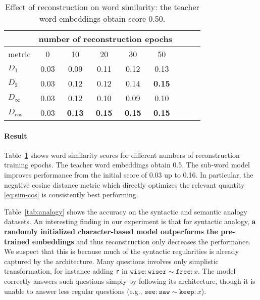 \documentclass[11pt,letterpaper,UTF8]{article}
\begin{document}
\begin{CJK}{UTF8}{gbsn}
\begin{table}[t!]
\begin{center}
{
\begin{tabular}{|l|c|c|c|c|c|c|c|c|}
\hline
                &  \multicolumn{5}{c|}{number of reconstruction epochs}        \\
\hline
metric          &   0           &  10             &  20           &  30    &  50  \\
\hline
$D_1$           &  0.03         &  0.09           & 0.11          & 0.12   &  0.13 \\
$D_2$           &  0.03         &  0.12           & 0.12          & 0.14   &  \textbf{0.15} \\
$D_\infty$       &  0.03         &  0.12           & 0.10          & 0.09   &  0.10 \\
$D_{\cos{}}$     &  0.03         &  \textbf{0.13}  & \textbf{0.15} & \textbf{0.15}  &  \textbf{0.15} \\
\hline
\end{tabular}
\caption{Effect of reconstruction on word similarity: the teacher word embeddings obtain score 0.50.}
\label{tab:similarity}
}
\end{center}
\vspace{-1mm}
\end{table}

\paragraph{Result}
Table~\ref{tab:similarity} shows word similarity scores for different numbers of reconstruction training epochs.
The teacher word embeddings obtain 0.5. The sub-word model improves performance from the initial score of 0.03 up to 0.16.
In particular, the negative cosine distance metric which directly optimizes the relevant quantity \eqref{eq:sim-cos}
is consistently best performing.

Table~\ref{tab:analogy} shows the accuracy on the syntactic and semantic analogy datasets.
An interesting finding in our experiment is that for syntactic analogy,
\textbf{a randomly initialized character-based model outperforms the pre-trained embeddings}
and thus reconstruction only decreases the performance.
We suspect that this is because much of the syntactic regularities is already captured by the architecture.
Many questions involves only simplistic transformation, for instance adding \texttt{r} in $\texttt{wise}:\texttt{wiser}\sim\texttt{free}:x$.
The model correctly answers such questions simply by following its architecture, though it is unable to
answer less regular questions (e.g., $\texttt{see}:\texttt{saw}\sim\texttt{keep}:x$).


\end{CJK}
\end{document}
